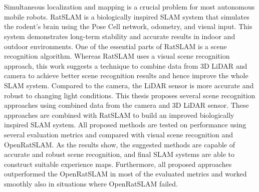 \chapter{\abstractname}

Simultaneous localization and mapping is a crucial problem for most autonomous mobile robots. RatSLAM is a biologically inspired SLAM system that simulates the rodent's brain using the Pose Cell network, odometry, and visual input. This system demonstrates long-term stability and accurate results in indoor and outdoor environments. One of the essential parts of RatSLAM is a scene recognition algorithm. Whereas RatSLAM uses a visual scene recognition approach, this work suggests a technique to combine data from 3D LiDAR and camera to achieve better scene recognition results and hence improve the whole SLAM system. Compared to the camera, the LiDAR sensor is more accurate and robust to changing light conditions. This thesis proposes several scene recognition approaches using combined data from the camera and 3D LiDAR sensor. These approaches are combined with RatSLAM to build an improved biologically inspired SLAM system. All proposed methods are tested on performance using several evaluation metrics and compared with visual scene recognition and OpenRatSLAM. As the results show, the suggested methods are capable of accurate and robust scene recognition, and final SLAM systems are able to construct suitable experience maps. Furthermore, all proposed approaches outperformed the OpenRatSLAM in most of the evaluated metrics and worked smoothly also in situations where OpenRatSLAM failed.


\makeatletter
{}
{\renewcommand{\abstractname}{Kurzfassung}}
{\renewcommand{\abstractname}{Abstract}}
\makeatother

\chapter{\abstractname}

